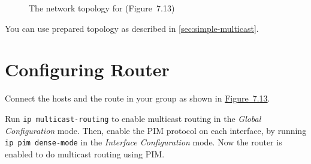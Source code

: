 \documentclass{../UTNetLab}
\begin{document}
    \begin{figure}[H]
        \centering
        \caption{The network topology for  (Figure~7.13)}
        \label{fig:7.13}
    \end{figure}


    You can use prepared topology as described in \autoref{sec:simple-multicast}.

\section{Configuring Router}
\label{sec:config-router}
    Connect the hosts and the route in your group as shown in \hyperref[fig:7.13]{Figure~7.13}.
    
    Run \lstinline{ip multicast-routing} to enable multicast routing in the \textit{Global Configuration} mode.
    Then, enable the PIM protocol on each interface, by running \lstinline{ip pim dense-mode} in the \textit{Interface Configuration} mode.
    Now the router is enabled to do multicast routing using PIM.
\end{document}
